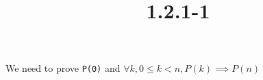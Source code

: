 \documentclass{article}
\title{1.2.1-1}
\begin{document}
\maketitle

We need to prove \texttt{P(0)} and \( \forall k, 0 \leq k < n, P(k) \implies P(n) \)
\end{document}
